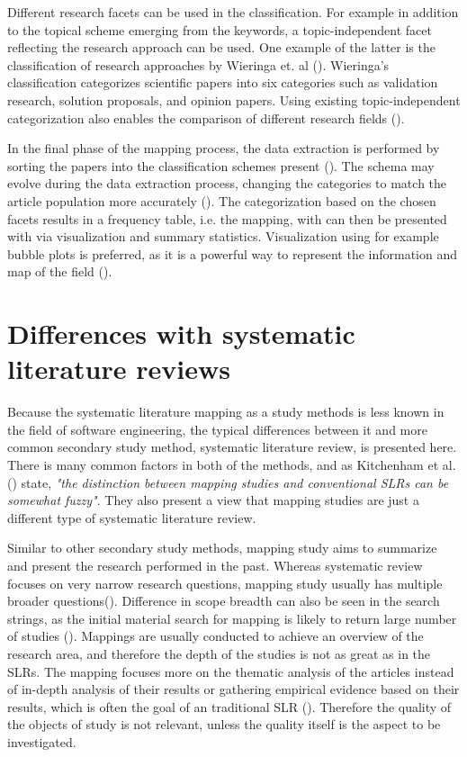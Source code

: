 \documentclass[utf8,english]{gradu3}
\begin{document}
Different research facets can be used in the classification. For example in
addition to the topical scheme emerging from the keywords, a topic-independent
facet reflecting the research approach can be used. One example of the latter is
the classification of research approaches by Wieringa et. al
(\cite*{wieringa2006}). Wieringa's classification categorizes scientific papers
into six categories such as validation research, solution proposals, and opinion
papers. Using existing topic-independent categorization also enables the
comparison of  different research fields (\cite{petersen2015}).

In the final phase of the mapping process, the data extraction is performed by
sorting the papers into the classification schemes present
(\cite{petersen2008}). The schema may evolve during the data extraction process,
changing the categories to match the article population more accurately
(\cite{petersen2015}). The categorization based on the chosen facets results in
a frequency table, i.e. the mapping, with can then be presented with via
visualization and summary statistics. Visualization using for example bubble
plots is preferred, as it is a powerful way to represent the information and map
of the field (\cite{petersen2008}).


\section{Differences with systematic literature reviews}

Because the systematic literature mapping as a study methods is less known in
the field of software engineering, the typical differences between it and more
common secondary study method, systematic literature review, is presented here.
There is many common factors in both of the methods, and as Kitchenham et al.
(\cite{kitchenham2010}) state, \textit{"the distinction between mapping studies
  and conventional SLRs can be somewhat fuzzy"}. They also present a view that
mapping studies are just a different type of systematic literature review.

Similar to other secondary study methods, mapping study aims to summarize and
present the research performed in the past. Whereas systematic review focuses on
very narrow research questions, mapping study usually has multiple broader
questions(\cite{kitchenham2010}). Difference in scope breadth can also be seen
in the search strings, as the initial material search for mapping is likely to
return large number of studies (\cite{kitchenham2007, petersen2008}). Mappings
are usually conducted to achieve an overview of the research area, and therefore
the depth of the studies is not as great as in the SLRs. The mapping focuses
more on the thematic analysis of the articles instead of in-depth analysis of
their results or gathering empirical evidence based on their results, which is
often the goal of an traditional SLR (\cite{petersen2008}). Therefore the
quality of the objects of study is not relevant, unless the quality itself is
the aspect to be investigated.
\end{document}

